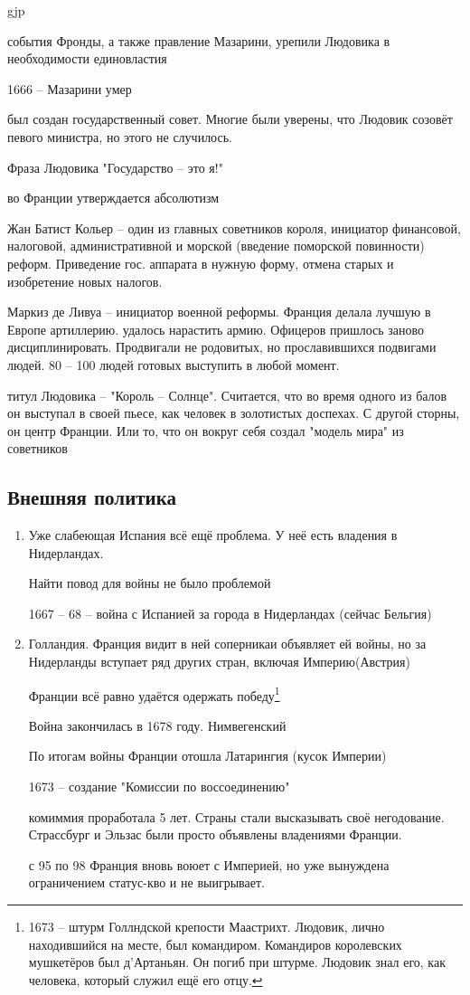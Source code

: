 gjp	 \documentclass[12pt,a4paper]{article}
\begin{document}
события Фронды, а также правление Мазарини, урепили Людовика в необходимости единовластия

1666 -- Мазарини умер

был создан государственный совет. Многие были уверены, что Людовик созовёт певого министра, но этого не случилось.

Фраза Людовика "Государство -- это я!"

во Франции утверждается абсолютизм

Жан Батист Кольер -- один из главных советников короля, инициатор финансовой, налоговой, административной и морской (введение поморской повинности) реформ. Приведение гос. аппарата в нужную форму, отмена старых и изобретение новых налогов. 

Маркиз де Ливуа -- инициатор военной реформы. Франция делала лучшую в Европе артиллерию. удалось нарастить армию. Офицеров пришлось заново дисциплинировать. Продвигали не родовитых, но прославившихся подвигами людей. 80 -- 100 людей готовых выступить в любой момент.

титул Людовика -- "Король -- Солнце". Считается, что во время одного из балов он выступал в своей пьесе, как человек в золотистых доспехах. С другой сторны, он центр Франции. Или то, что он вокруг себя создал "модель мира" из советников

\subsection{Внешняя политика}
\begin{enumerate}
\item Уже слабеющая Испания всё ещё проблема. У неё есть владения в Нидерландах.

Найти повод для войны не было проблемой

1667 -- 68 -- война с Испанией за города в Нидерландах (сейчас Бельгия)
\item Голландия. Франция видит в ней соперникаи объявляет ей войны, но за Нидерланды вступает ряд других стран, включая Империю(Австрия)

Франции всё равно удаётся одержать победу\footnote{1673 -- штурм Голлндской крепости Маастрихт. Людовик, лично находившийся на месте, был командиром. Командиров королевских мушкетёров был д'Артаньян. Он погиб при штурме. Людовик знал его, как человека, который служил ещё его отцу.}

Война закончилась в 1678 году. Нимвегенский

По итогам войны Франции отошла Латарингия (кусок Империи)

1673 -- создание "Комиссии по воссоединению"

комиммия проработала 5 лет. Страны стали высказывать своё негодование. Страссбург и Эльзас были просто объявлены владениями Франции. 

с 95 по 98 Франция вновь воюет с Империей, но уже вынуждена ограничением статус-кво и не выигрывает.

\end{enumerate}
\end{document}
